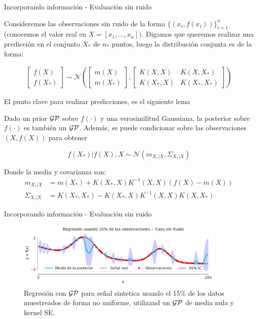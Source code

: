 \documentclass[9pt]{beamer}
\begin{document}
\begin{frame}{Incorporando información - Evaluación sin ruido}

Consideremos las observaciones sin ruido de la forma $\{(x_i, f(x_i))\}_{i=1}^{n}$ (conocemos el valor real en $X = [x_1 , \dots , x_n])$. Digamos que queremos realizar una predicción en el conjunto $X_*$ de $n_*$ puntos, luego la distribución conjunta es de la forma: \pause 

\begin{align*}
  \begin{bmatrix} f(X) \\ f(X_*)  \end{bmatrix}
  \sim \mathcal{N} \left(
  \begin{bmatrix} m(X) \\ m(X_*)  \end{bmatrix}, 
  \begin{bmatrix}
    K(X, X) & K(X, X_*) \\ K(X_*, X) & K(X_*, X_*)
  \end{bmatrix}
   \right)
\end{align*} \pause 

El punto clave para realizar predicciones, es el siguiente lema \pause 

\begin{lemma}
  Dado un prior $\mathcal{GP}$ sobre $f(\cdot)$ y una verosimilitud Gaussiana, la posterior sobre $f(\cdot)$ es también un $\mathcal{GP}$. Además, se puede condicionar sobre las observaciones $(X, f(X))$ para obtener

\begin{equation*}
  f(X_*)|f(X), X  \sim \mathcal{N}(m_{X_*|X}, \Sigma_{X_*|X}) \label{eq:gp_post}
\end{equation*}

Donde la media y covarianza son:
\begin{align*}
  m_{X_*|X} & = m(X_*) + K(X_*, X)K^{-1}(X, X) (f(X) - m(X))\\
   \Sigma_{X_*|X} & = K(X_*, X_*) - K(X_*, X)K^{-1}(X, X) K(X, X_*)
\end{align*}
\end{lemma}

\end{frame}

\begin{frame}{Incorporando información - Evaluación sin ruido}
\begin{figure}[H]
  \centering
  \includegraphics[width=0.9\textwidth]{../img/cap8_posterior_no_ruido}
  \caption{Regresión con $\mathcal{GP}$ para señal sintetica usando el 15$\%$ de los datos muestreados de forma no uniforme, utilizand un $\mathcal{GP}$ de media nula y kernel SE.} 
  \label{fig:gp_2}
\end{figure}


\end{frame}
\end{document}
